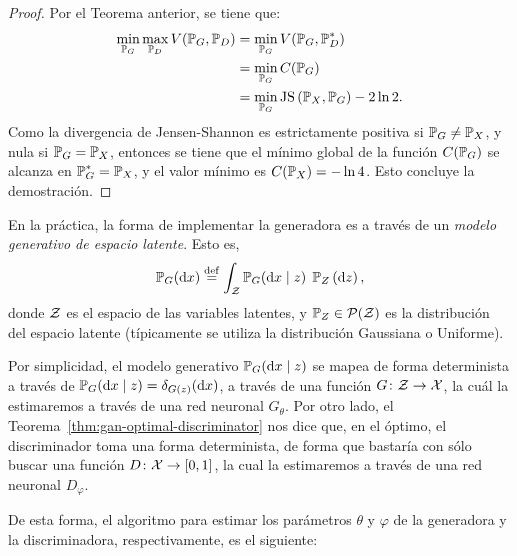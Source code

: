 {{{\begin{proof}
    Por el Teorema anterior, se tiene que:
    \begin{align*}
        \min_{\Prob_G} \max_{\Prob_D} V(\Prob_G, \Prob_D)
         & = \min_{\Prob_G} V(\Prob_G, \Prob_D^\ast)         \\
         & = \min_{\Prob_G} C(\Prob_G)                       \\
         & = \min_{\Prob_G} \JS{\Prob_X}{\Prob_G} - 2 \ln 2.
    \end{align*}
    Como la divergencia de Jensen-Shannon es estrictamente positiva si $\Prob_G \neq \Prob_X$, y nula si $\Prob_G = \Prob_X$, entonces se tiene que el mínimo global de la función $C(\Prob_G)$ se alcanza en $\Prob_G^\ast = \Prob_X$, y el valor mínimo es $C(\Prob_X) = - \ln 4$. Esto concluye la demostración.
\end{proof}

En la práctica, la forma de implementar la generadora es a través de un \emph{modelo generativo de espacio latente}. Esto es,
\begin{equation}
    \Prob_G (\dd x) \eqdef \int_\cZ \Prob_G(\dd x \mid z) \; \Prob_Z \left( \dd z\right),
\end{equation}
donde $\mathcal{Z}$ es el espacio de las variables latentes, y $\Prob_Z \in \ProbSpace[\cZ] $ es la distribución del espacio latente (típicamente se utiliza la distribución Gaussiana o Uniforme).

Por simplicidad, el modelo generativo $\Prob_G (\dd x \mid z)$ se mapea de forma determinista a través de $\Prob_G (\dd x \mid z) = \delta_{G(z)}(\dd x)$, a través de una función $G\colon \mathcal{Z} \to \mathcal{X}$, la cuál la estimaremos a través de una red neuronal $G_\theta$. Por otro lado, el Teorema~\ref{thm:gan-optimal-discriminator} nos dice que, en el óptimo, el discriminador toma una forma determinista, de forma que bastaría con sólo buscar una función $D\colon\mathcal{X}\to [0, 1]$, la cual la estimaremos a través de una red neuronal $D_\varphi$.

De esta forma, el algoritmo para estimar los parámetros $\theta$ y $\varphi$ de la generadora y la discriminadora, respectivamente, es el siguiente:

}}}
